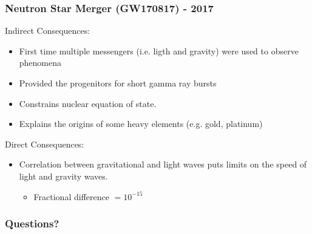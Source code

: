 \documentclass{beamer}
\begin{document}
\begin{frame}
\frametitle{Neutron Star Merger (GW170817) - 2017}
    Indirect Consequences:
    \pause
    \begin{itemize}
        \item First time multiple messengers (i.e. ligth and gravity) were used to observe phenomena
        \pause
        \item Provided the progenitors for short gamma ray bursts
        \pause
        \item Constrains nuclear equation of state.
        \pause
        \item Explains the origins of some heavy elements (e.g. gold, platinum)
        \pause
    \end{itemize}
    Direct Consequences:
    \begin{itemize}
        \item Correlation between gravitational and light waves puts limits on the speed of light and gravity waves. 
        \begin{itemize}
            \pause
            \item Fractional difference $= 10^{-15}$
        \end{itemize}
    \end{itemize}
\end{frame}


\begin{frame}
\frametitle{Questions?}
\end{frame}
\end{document}
